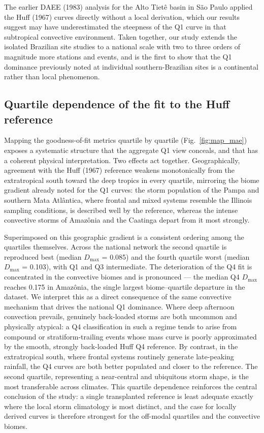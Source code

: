 \documentclass[a4paper,fleqn]{cas-sc}
\begin{document}
The earlier DAEE (1983) analysis for the Alto Tietê basin in São Paulo
applied the Huff (1967) curves directly without a local derivation,
which our results suggest may have underestimated the steepness of the
Q1 curve in that subtropical convective environment. Taken together,
our study extends the isolated Brazilian site studies to a national
scale with two to three orders of magnitude more stations and events,
and is the first to show that the Q1 dominance previously noted at
individual southern-Brazilian sites is a continental rather than local
phenomenon.

\subsection{Quartile dependence of the fit to the Huff reference}
\label{sec:quartile_fit}

Mapping the goodness-of-fit metrics quartile by quartile
(Fig.~\ref{fig:map_mae}) exposes a systematic structure that the
aggregate Q1 view conceals, and that has a coherent physical
interpretation. Two effects act together. Geographically, agreement
with the Huff (1967) reference weakens monotonically from the
extratropical south toward the deep tropics in every quartile, mirroring
the biome gradient already noted for the Q1 curves: the storm
population of the Pampa and southern Mata Atlântica, where frontal and
mixed systems resemble the Illinois sampling conditions, is described
well by the reference, whereas the intense convective storms of
Amazônia and the Caatinga depart from it most strongly.

Superimposed on this geographic gradient is a consistent ordering among
the quartiles themselves. Across the national network the second
quartile is reproduced best (median $D_\mathrm{max}$ = 0.085) and the
fourth quartile worst (median $D_\mathrm{max}$ = 0.103), with Q1 and Q3
intermediate. The deterioration of the Q4 fit is concentrated in the
convective biomes and is pronounced — the median Q4 $D_\mathrm{max}$
reaches 0.175 in Amazônia, the single largest biome–quartile departure
in the dataset. We interpret this as a direct consequence of the same
convective mechanism that drives the national Q1 dominance. Where deep
afternoon convection prevails, genuinely back-loaded storms are both
uncommon and physically atypical: a Q4 classification in such a regime
tends to arise from compound or stratiform-trailing events whose mass
curve is poorly approximated by the smooth, strongly back-loaded Huff
Q4 reference. By contrast, in the extratropical south, where frontal
systems routinely generate late-peaking rainfall, the Q4 curves are
both better populated and closer to the reference. The second quartile,
representing a near-central and ubiquitous storm shape, is the most
transferable across climates. This quartile dependence reinforces the
central conclusion of the study: a single transplanted reference is
least adequate exactly where the local storm climatology is most
distinct, and the case for locally derived curves is therefore
strongest for the off-modal quartiles and the convective biomes.
\end{document}
